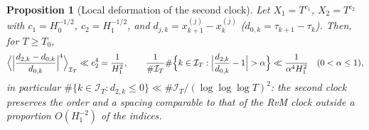 \documentclass[preprint,12pt]{elsarticle}
\numberwithin{equation}{section}
\theoremstyle{plain}
\newtheorem{proposition}[theorem]{Proposition}
\theoremstyle{definition}
\theoremstyle{remark}
\newcommand{\IT}{\mathcal I_T}
\begin{document}
\begin{proposition}[Local deformation of the second clock]\label{prop:deformation}
Let $X_1=T^{c_1}$, $X_2=T^{c_2}$ with $c_1=H_0^{-1/2}$, $c_2=H_1^{-1/2}$, and $d_{j,k}=x^{(j)}_{k+1}-x^{(j)}_k$ ($d_{0,k}=\tau_{k+1}-\tau_k$). Then, for $T\ge T_0$,
\begin{equation}
\Bigl\langle\Bigl|\frac{d_{2,k}-d_{0,k}}{d_{0,k}}\Bigr|^4\Bigr\rangle_{\IT}\ll c_2^4=\frac1{H_1^2},\qquad
\frac1{\#\IT}\#\Bigl\{k\in\IT:\Bigl|\frac{d_{2,k}}{d_{0,k}}-1\Bigr|>\alpha\Bigr\}\ll\frac1{\alpha^4H_1^2}\quad(0<\alpha\le1),
\label{eq:deformation}
\end{equation}
in particular $\#\{k\in\IT:d_{2,k}\le0\}\ll\#\IT/(\log\log\log T)^2$: the second clock preserves the order and a spacing comparable to that of the RvM clock outside a proportion $O(H_1^{-2})$ of the indices.
\end{proposition}
\end{document}
